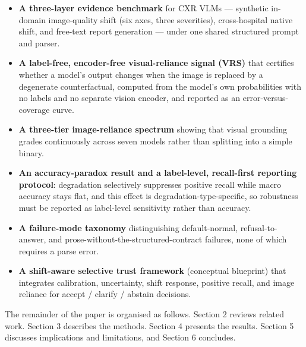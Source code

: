 \begin{itemize}
\item \textbf{A three-layer evidence benchmark} for CXR VLMs --- synthetic in-domain image-quality shift (six axes, three severities), cross-hospital native shift, and free-text report generation --- under one shared structured prompt and parser.
\item \textbf{A label-free, encoder-free visual-reliance signal (VRS)} that certifies whether a model's output changes when the image is replaced by a degenerate counterfactual, computed from the model's own probabilities with no labels and no separate vision encoder, and reported as an error-versus-coverage curve.
\item \textbf{A three-tier image-reliance spectrum} showing that visual grounding grades continuously across seven models rather than splitting into a simple binary.
\item \textbf{An accuracy-paradox result and a label-level, recall-first reporting protocol}: degradation selectively suppresses positive recall while macro accuracy stays flat, and this effect is degradation-type-specific, so robustness must be reported as label-level sensitivity rather than accuracy.
\item \textbf{A failure-mode taxonomy} distinguishing default-normal, refusal-to-answer, and prose-without-the-structured-contract failures, none of which requires a parse error.
\item \textbf{A shift-aware selective trust framework} (conceptual blueprint) that integrates calibration, uncertainty, shift response, positive recall, and image reliance for accept / clarify / abstain decisions.
\end{itemize}

The remainder of the paper is organised as follows. Section 2 reviews related work. Section 3 describes the methods. Section 4 presents the results. Section 5 discusses implications and limitations, and Section 6 concludes.